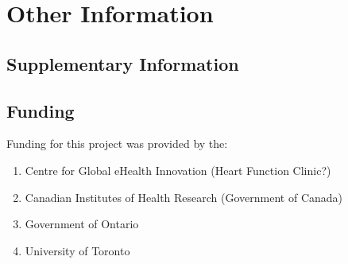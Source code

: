 \documentclass[]{article}
\begin{document}
\section{Other Information}
\subsection{Supplementary Information} %

\subsection{Funding} %
Funding for this project was provided by the:
\begin{enumerate}[label=,itemsep=0mm]
	\item Centre for Global eHealth Innovation (Heart Function Clinic?)  %
	\item Canadian Institutes of Health Research (Government of Canada)
	\item Government of Ontario
	\item University of Toronto
\end{enumerate} 



\end{document}
